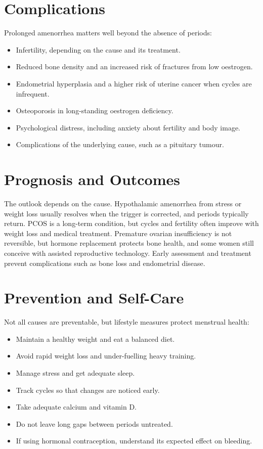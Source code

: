 \section*{Complications}
Prolonged amenorrhea matters well beyond the absence of periods:

\begin{itemize}
    \item Infertility, depending on the cause and its treatment.
    \item Reduced bone density and an increased risk of fractures from low oestrogen.
    \item Endometrial hyperplasia and a higher risk of uterine cancer when cycles are infrequent.
    \item Osteoporosis in long-standing oestrogen deficiency.
    \item Psychological distress, including anxiety about fertility and body image.
    \item Complications of the underlying cause, such as a pituitary tumour.
\end{itemize}

\section*{Prognosis and Outcomes}
The outlook depends on the cause. Hypothalamic amenorrhea from stress or weight loss usually resolves when the trigger is corrected, and periods typically return. PCOS is a long-term condition, but cycles and fertility often improve with weight loss and medical treatment. Premature ovarian insufficiency is not reversible, but hormone replacement protects bone health, and some women still conceive with assisted reproductive technology. Early assessment and treatment prevent complications such as bone loss and endometrial disease.

\section*{Prevention and Self-Care}
Not all causes are preventable, but lifestyle measures protect menstrual health:

\begin{itemize}
    \item Maintain a healthy weight and eat a balanced diet.
    \item Avoid rapid weight loss and under-fuelling heavy training.
    \item Manage stress and get adequate sleep.
    \item Track cycles so that changes are noticed early.
    \item Take adequate calcium and vitamin D.
    \item Do not leave long gaps between periods untreated.
    \item If using hormonal contraception, understand its expected effect on bleeding.
\end{itemize}

